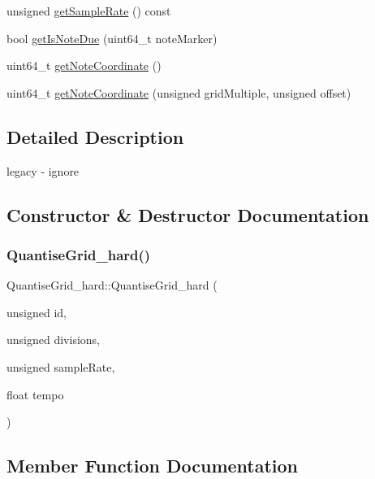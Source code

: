 \begin{DoxyCompactItemize}
\item 
unsigned \mbox{\hyperlink{classQuantiseGrid__hard_a41087eff0a5dedd05377a082c8593e15}{get\+Sample\+Rate}} () const
\item 
bool \mbox{\hyperlink{classQuantiseGrid__hard_a30832e3feacf7bd155b077f008ac068b}{get\+Is\+Note\+Due}} (uint64\+\_\+t note\+Marker)
\item 
uint64\+\_\+t \mbox{\hyperlink{classQuantiseGrid__hard_ae346d17f70b637c23d41a3a22b6d5985}{get\+Note\+Coordinate}} ()
\item 
uint64\+\_\+t \mbox{\hyperlink{classQuantiseGrid__hard_a286bde161a2a93fdd8a4964d23f76dcd}{get\+Note\+Coordinate}} (unsigned grid\+Multiple, unsigned offset)
\end{DoxyCompactItemize}


\subsection{Detailed Description}
legacy -\/ ignore 

\subsection{Constructor \& Destructor Documentation}
\mbox{\label{classQuantiseGrid__hard_afd37064563533282cf9c6623cd1c89da}} 
\subsubsection{\texorpdfstring{Quantise\+Grid\+\_\+hard()}{QuantiseGrid\_hard()}}
{\footnotesize\ttfamily Quantise\+Grid\+\_\+hard\+::\+Quantise\+Grid\+\_\+hard (\begin{DoxyParamCaption}\item[{unsigned}]{id,  }\item[{unsigned}]{divisions,  }\item[{unsigned}]{sample\+Rate,  }\item[{float}]{tempo }\end{DoxyParamCaption})}



\subsection{Member Function Documentation}
\mbox{\label{classQuantiseGrid__hard_ad2e99cf2fde8a376ff22bc8d755428d8}} 
